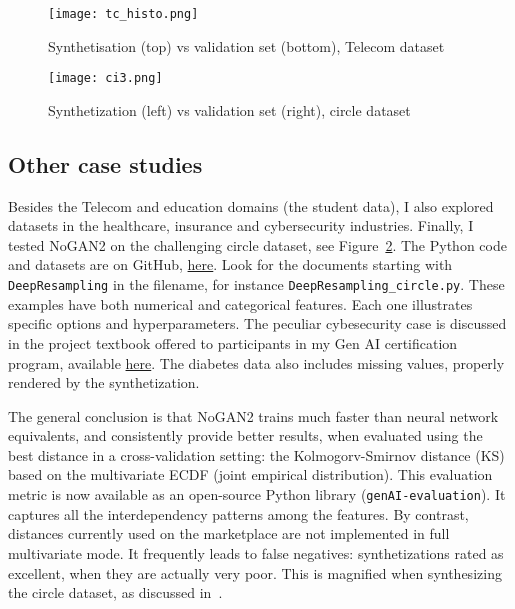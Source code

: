 \documentclass[oneside,10pt]{book}
\begin{document}
\begin{figure}[H]
\centering
\texttt{[image: tc\_histo.png]} %
\caption{Synthetisation (top) vs validation set (bottom), Telecom dataset}
\label{fig:nogrdf2abc}
\end{figure}

\begin{figure}[H]
\centering
\texttt{[image: ci3.png]} %
\caption{Synthetization (left) vs validation set (right), circle dataset}
\label{fig:nohhys0oabc}
\end{figure}

\subsection{Other case studies}

Besides the Telecom and education domains (the student data), I also explored datasets in the healthcare, insurance and cybersecurity industries. Finally,  I tested NoGAN2 on the challenging circle dataset, see Figure~\ref{fig:nohhys0oabc}. The Python code and datasets are on GitHub, 
 \href{https://github.com/VincentGranville/Main}{here}. Look for the documents starting with \texttt{DeepResampling} in the filename, for
 instance \texttt{DeepResampling\_circle.py}. These examples have both numerical and categorical features. Each one illustrates specific options 
 and hyperparameters. The peculiar cybesecurity case is discussed in the project textbook offered to participants in my 
Gen AI certification program, available \href{https://mltblog.com/3pWxvZK}{here}. The diabetes data also includes missing values, properly rendered by the synthetization.



The general conclusion is that NoGAN2 trains much faster than neural network equivalents, and consistently provide better results, when evaluated using the best distance in a cross-validation setting: the Kolmogorv-Smirnov distance (KS) based on the multivariate ECDF (joint empirical distribution). This evaluation metric is now available as an open-source Python library (\texttt{genAI-evaluation}). It captures all the interdependency patterns among the features. By contrast, distances currently used on the marketplace are not implemented in full multivariate mode. It frequently leads to false negatives: synthetizations rated as excellent, when they are actually very poor. This is magnified when synthesizing the circle dataset, as discussed in~\cite{vgvendors}.
\end{document}

